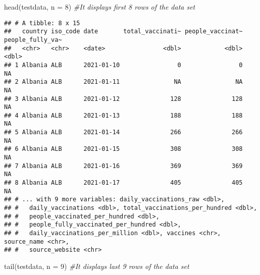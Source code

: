 \documentclass[
]{article}
\newenvironment{Shaded}{\begin{snugshade}}{\end{snugshade}}
\newcommand{\AttributeTok}[1]{\textcolor[rgb]{0.77,0.63,0.00}{#1}}
\newcommand{\CommentTok}[1]{\textcolor[rgb]{0.56,0.35,0.01}{\textit{#1}}}
\newcommand{\DecValTok}[1]{\textcolor[rgb]{0.00,0.00,0.81}{#1}}
\newcommand{\FunctionTok}[1]{\textcolor[rgb]{0.00,0.00,0.00}{#1}}
\newcommand{\NormalTok}[1]{#1}
\begin{document}
\begin{Shaded}
\begin{Highlighting}[]
\FunctionTok{head}\NormalTok{(testdata, }\AttributeTok{n =} \DecValTok{8}\NormalTok{) }\CommentTok{\#It displays first 8 rows of the data set}
\end{Highlighting}
\end{Shaded}

\begin{verbatim}
## # A tibble: 8 x 15
##   country iso_code date       total_vaccinati~ people_vaccinat~ people_fully_va~
##   <chr>   <chr>    <date>                <dbl>            <dbl>            <dbl>
## 1 Albania ALB      2021-01-10                0                0               NA
## 2 Albania ALB      2021-01-11               NA               NA               NA
## 3 Albania ALB      2021-01-12              128              128               NA
## 4 Albania ALB      2021-01-13              188              188               NA
## 5 Albania ALB      2021-01-14              266              266               NA
## 6 Albania ALB      2021-01-15              308              308               NA
## 7 Albania ALB      2021-01-16              369              369               NA
## 8 Albania ALB      2021-01-17              405              405               NA
## # ... with 9 more variables: daily_vaccinations_raw <dbl>,
## #   daily_vaccinations <dbl>, total_vaccinations_per_hundred <dbl>,
## #   people_vaccinated_per_hundred <dbl>,
## #   people_fully_vaccinated_per_hundred <dbl>,
## #   daily_vaccinations_per_million <dbl>, vaccines <chr>, source_name <chr>,
## #   source_website <chr>
\end{verbatim}

\begin{Shaded}
\begin{Highlighting}[]
\FunctionTok{tail}\NormalTok{(testdata, }\AttributeTok{n =} \DecValTok{9}\NormalTok{) }\CommentTok{\#It displays last 9 rows of the data set}
\end{Highlighting}
\end{Shaded}
\end{document}
